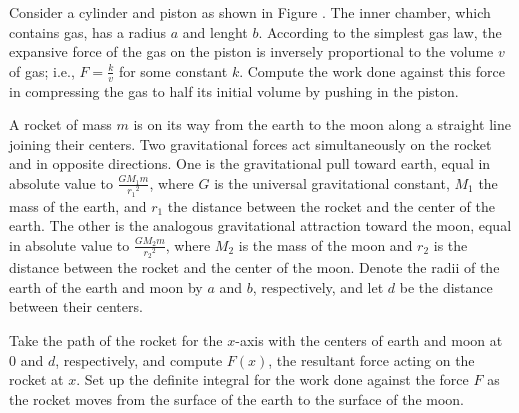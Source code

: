 \begin{exercises}
Consider a cylinder and piston as shown in
Figure .  The inner chamber,
which contains gas, has a radius $a$ and
lenght $b$.  According to the simplest gas law,
the expansive force of the gas on the piston
is inversely proportional to the volume $v$ of gas;
i.e., $F = \frac{k}{v}$ for some constant $k$.
Compute the work done against this force
in compressing the gas to half its initial
volume by pushing in the piston.

A rocket of mass $m$ is on its way from the earth
to the moon along a straight line joining their centers.
Two gravitational forces act simultaneously on the
rocket and in opposite directions.
One is the gravitational pull toward earth,
equal in absolute value to $\frac{GM_1m}{{r_1}^2}$,
where $G$ is the universal gravitational constant,
$M_1$ the mass of the earth, and $r_1$ the
distance between the rocket and the center of
the earth.  The other is the analogous gravitational
attraction toward the moon,
equal in absolute value to $\frac{GM_2m}{{r_2}^2}$,
where $M_2$ is the mass of the moon and $r_2$
is the distance between the rocket and the center
of the moon.  Denote the radii of the earth
of the earth and moon by $a$ and $b$,
respectively, and let $d$ be the distance between
their centers.
\begin{exenum}
\x
Take the path of the rocket for the $x$-axis
with the centers of earth and moon at $0$
and $d$, respectively, and compute $F(x)$,
the resultant force acting on the rocket at $x$.
\x
Set up the definite integral for the work done
against the force $F$ as the rocket moves
from the surface of the earth to the
surface of the moon.
\end{exenum}

\end{exercises}
